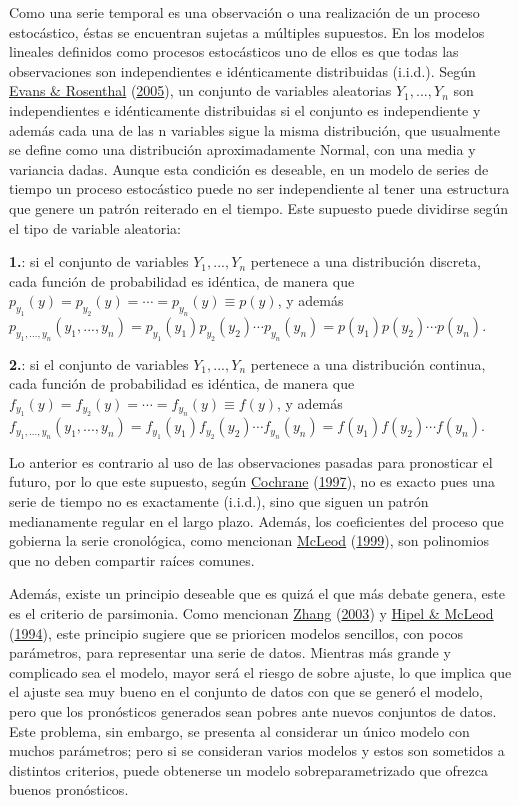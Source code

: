 \documentclass[
]{article}
\begin{document}
Como una serie temporal es una observación o una realización de un
proceso estocástico, éstas se encuentran sujetas a múltiples supuestos.
En los modelos lineales definidos como procesos estocásticos uno de
ellos es que todas las observaciones son independientes e idénticamente
distribuidas (i.i.d.). Según
\protect\hyperlink{ref-definicion_iid}{Evans \& Rosenthal}
(\protect\hyperlink{ref-definicion_iid}{2005}), un conjunto de variables
aleatorias \(Y_1,...,Y_n\) son independientes e idénticamente
distribuidas si el conjunto es independiente y además cada una de las n
variables sigue la misma distribución, que usualmente se define como una
distribución aproximadamente Normal, con una media y variancia dadas.
Aunque esta condición es deseable, en un modelo de series de tiempo un
proceso estocástico puede no ser independiente al tener una estructura
que genere un patrón reiterado en el tiempo. Este supuesto puede
dividirse según el tipo de variable aleatoria:

\textbf{1.}: si el conjunto de variables \(Y_1,...,Y_n\) pertenece a una
distribución discreta, cada función de probabilidad es idéntica, de
manera que \(p_{y_1}(y)=p_{y_2}(y)=\cdots=p_{y_n}(y)\equiv p(y)\), y
además
\(p_{y_1,...,y_n}(y_1,...,y_n)=p_{y_1}(y_1)p_{y_2}(y_2)\cdots p_{y_n}(y_n)=p(y_1)p(y_2)\cdots p(y_n)\).

\textbf{2.}: si el conjunto de variables \(Y_1,...,Y_n\) pertenece a una
distribución continua, cada función de probabilidad es idéntica, de
manera que \(f_{y_1}(y)=f_{y_2}(y)=\cdots=f_{y_n}(y)\equiv f(y)\), y
además
\(f_{y_1,...,y_n}(y_1,...,y_n)=f_{y_1}(y_1)f_{y_2}(y_2)\cdots f_{y_n}(y_n)=f(y_1)f(y_2)\cdots f(y_n)\).

Lo anterior es contrario al uso de las observaciones pasadas para
pronosticar el futuro, por lo que este supuesto, según
\protect\hyperlink{ref-Cochrane}{Cochrane}
(\protect\hyperlink{ref-Cochrane}{1997}), no es exacto pues una serie de
tiempo no es exactamente (i.i.d.), sino que siguen un patrón
medianamente regular en el largo plazo. Además, los coeficientes del
proceso que gobierna la serie cronológica, como mencionan
\protect\hyperlink{ref-invertible_estacionario3}{McLeod}
(\protect\hyperlink{ref-invertible_estacionario3}{1999}), son polinomios
que no deben compartir raíces comunes.

Además, existe un principio deseable que es quizá el que más debate
genera, este es el criterio de parsimonia. Como mencionan
\protect\hyperlink{ref-Zhang}{Zhang}
(\protect\hyperlink{ref-Zhang}{2003}) y
\protect\hyperlink{ref-Hipel}{Hipel \& McLeod}
(\protect\hyperlink{ref-Hipel}{1994}), este principio sugiere que se
prioricen modelos sencillos, con pocos parámetros, para representar una
serie de datos. Mientras más grande y complicado sea el modelo, mayor
será el riesgo de sobre ajuste, lo que implica que el ajuste sea muy
bueno en el conjunto de datos con que se generó el modelo, pero que los
pronósticos generados sean pobres ante nuevos conjuntos de datos. Este
problema, sin embargo, se presenta al considerar un único modelo con
muchos parámetros; pero si se consideran varios modelos y estos son
sometidos a distintos criterios, puede obtenerse un modelo
sobreparametrizado que ofrezca buenos pronósticos.
\end{document}
